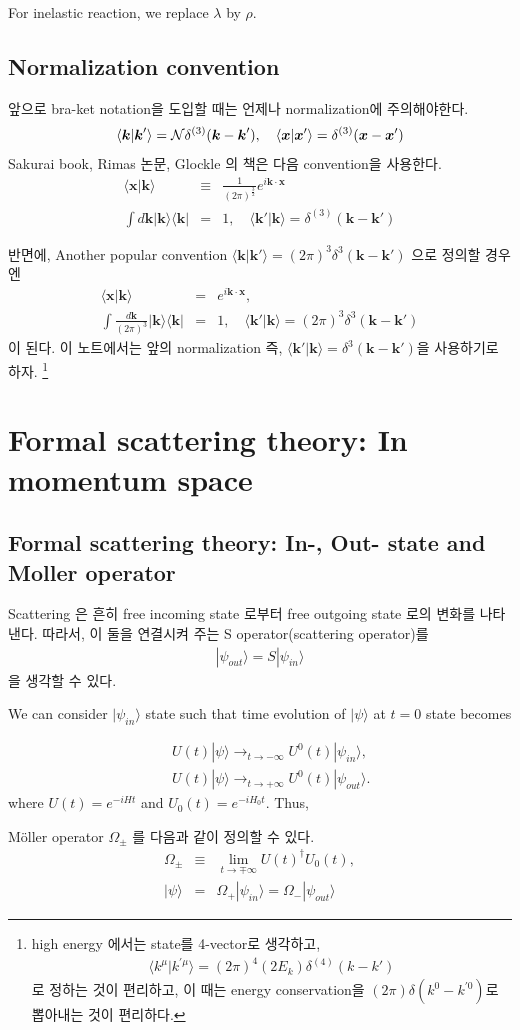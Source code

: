 \documentclass[10pt]{book}
\def\bm{\boldsymbol}
\newcommand{\bea}{\begin{eqnarray}}
\newcommand{\eea}{\end{eqnarray}}
\newcommand{\no}{\nonumber \\}
\def\vk{{\bm k}}
\def\vx{{\bm x}}
\def\la{\langle}
\def\ra{\rangle}
\begin{document}
For inelastic reaction, we replace $\lambda$ by
$\rho$. 


\section{Normalization convention}
앞으로 bra-ket notation을 도입할 때는 언제나 
normalization에 주의해야한다.
\bea 
\la \vk|\vk'\ra ={\cal N}\delta^{(3)}(\vk-\vk'),\quad
\la \vx|\vx'\ra =\delta^{(3)}(\vx-\vx')
\eea 
Sakurai book, Rimas 논문, Glockle 의 책은 다음 convention을 사용한다.
\bea
\la \vx|\vk\ra&\equiv&\frac{1}{(2\pi)^\frac{3}{2}}e^{i\vk\cdot\vx}
\no
\int d\vk |\vk\ra \la \vk|&=&1, \quad \la \vk'|\vk\ra=\delta^{(3)}(\vk-\vk')
\eea

반면에, Another popular convention 
$\la \vk|\vk'\ra=(2\pi)^3\delta^3(\vk-\vk')$ 으로 정의할 경우엔 
\bea
\la \vx|\vk\ra&=&e^{i\vk\cdot\vx},\no 
\int \frac{d\vk}{(2\pi)^3} |\vk\ra \la \vk|&=&1, 
\quad \la \vk'|\vk\ra=(2\pi)^3 \delta^{3}(\vk-\vk')
\eea
이 된다. 이 노트에서는 앞의 normalization 즉, $\la \vk'|\vk\ra=\delta^3(\vk-\vk')$을
사용하기로 하자.
\footnote{ high energy 에서는 state를 4-vector로
생각하고,
\bea
\la k^\mu | k^{'\mu}\ra=(2\pi)^4(2E_k)\delta^{(4)}(k-k')
\eea
로 정하는 것이 편리하고, 이 때는 energy conservation을
$(2\pi)\delta(k^0-k^{'0})$로 뽑아내는 것이 편리하다. }

\chapter{Formal scattering theory: In momentum space  }

\section{Formal scattering theory: In-, Out- state and Moller operator}
Scattering 은 흔히 free incoming state 로부터 
free outgoing state 로의 변화를 나타낸다.
따라서, 이 둘을 연결시켜 주는 S operator(scattering operator)를 
\bea
|\psi_{out}\ra=S|\psi_{in}\ra
\eea
을 생각할 수 있다. 

We can consider $|\psi_{in}\ra$ state such that 
time evolution of $|\psi\ra$ at $t=0$ state becomes

\bea
& &U(t)|\psi\ra \to_{t\to -\infty}  U^0(t)|\psi_{in}\ra ,\no
& &U(t)|\psi\ra \to_{t\to +\infty}  U^0(t)|\psi_{out}\ra.
\eea
where $U(t)=e^{-iH t}$ and $U_0(t)=e^{-iH_0 t}$. Thus,

M\"{o}ller operator $\Omega_{\pm}$ 를 다음과 같이 정의할 수 있다.
\bea
\Omega_{\pm}&\equiv&\lim_{t\to \mp\infty} U(t)^\dagger U_0(t),\no
|\psi\ra&=&\Omega_{+}|\psi_{in}\ra=\Omega_{-}|\psi_{out}\ra
\eea
\end{document}
